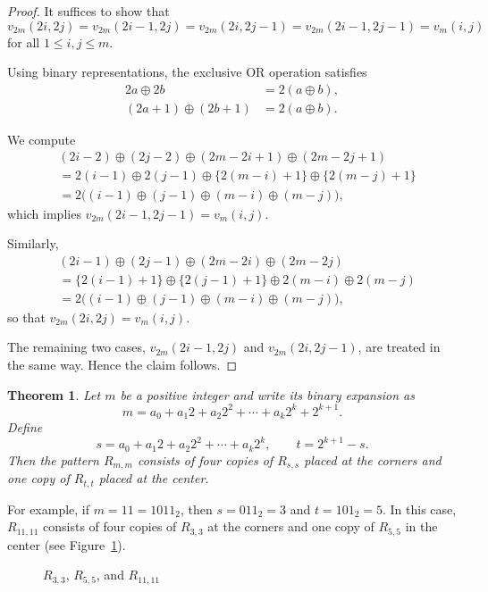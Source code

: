 \documentclass{article}
\theoremstyle{definition}
\theoremstyle{plain}
\newtheorem{theorem}[definition]{Theorem}
\theoremstyle{remark}
\begin{document}
\begin{proof}
It suffices to show that
\[
v_{2m}(2i,2j)
=
v_{2m}(2i-1,2j)
=
v_{2m}(2i,2j-1)
=
v_{2m}(2i-1,2j-1)
=
v_m(i,j)
\]
for all $1\le i,j\le m$.

Using binary representations, the exclusive OR operation satisfies
\begin{equation}
\label{eq:xor}
\begin{aligned}
2a\oplus2b &= 2(a\oplus b),\\
(2a+1)\oplus(2b+1) &= 2(a\oplus b).\nonumber
\end{aligned}
\end{equation}

We compute
\begin{align*}
&(2i-2)\oplus(2j-2)\oplus(2m-2i+1)\oplus(2m-2j+1)\\
&=2(i-1)\oplus2(j-1)\oplus\{2(m-i)+1\}\oplus\{2(m-j)+1\}\\
&=2\bigl((i-1)\oplus(j-1)\oplus(m-i)\oplus(m-j)\bigr),
\end{align*}
which implies $v_{2m}(2i-1,2j-1)=v_m(i,j)$.

Similarly,
\begin{align*}
&(2i-1)\oplus(2j-1)\oplus(2m-2i)\oplus(2m-2j)\\
&=\{2(i-1)+1\}\oplus\{2(j-1)+1\}\oplus2(m-i)\oplus2(m-j)\\
&=2\bigl((i-1)\oplus(j-1)\oplus(m-i)\oplus(m-j)\bigr),
\end{align*}
so that $v_{2m}(2i,2j)=v_m(i,j)$.

The remaining two cases,
$v_{2m}(2i-1,2j)$ and $v_{2m}(2i,2j-1)$, are treated in the same way.
Hence the claim follows.
\end{proof}

\begin{theorem}
\label{thm:decomposition}
Let $m$ be a positive integer and write its binary expansion as
\[
m = a_0 + a_1 2 + a_2 2^2 + \cdots + a_k 2^k + 2^{k+1}.
\]
Define
\[
s = a_0 + a_1 2 + a_2 2^2 + \cdots + a_k 2^k,
\qquad
t = 2^{k+1} - s.
\]
Then the pattern $R_{m,m}$ consists of four copies of $R_{s,s}$ placed at the
corners and one copy of $R_{t,t}$ placed at the center.
\end{theorem}

For example, if $m=11=1011_{2}$, then $s=011_{2}=3$ and $t=101_{2}=5$.
In this case, $R_{11,11}$ consists of four copies of $R_{3,3}$ at the corners
and one copy of $R_{5,5}$ in the center (see Figure~\ref{fig:decomposition}).

\begin{figure}[htbp]
\centering

\caption{$R_{3,3}$, $R_{5,5}$, and $R_{11,11}$}
\label{fig:decomposition}
\end{figure}
\end{document}
